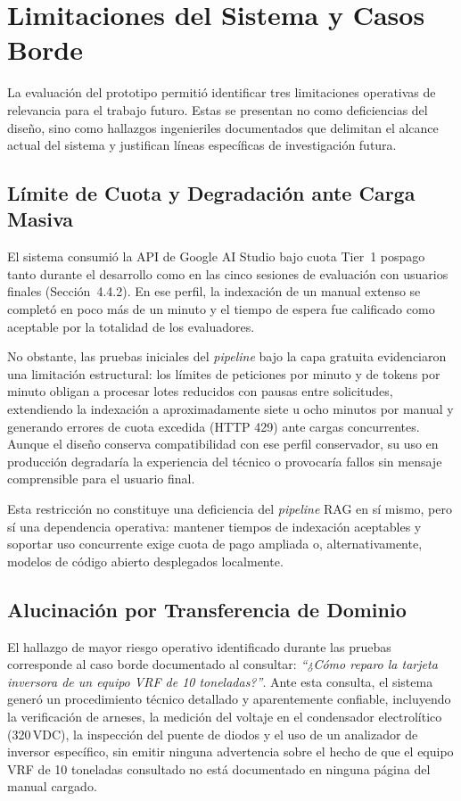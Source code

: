 {{\section{Limitaciones del Sistema y Casos Borde}
\label{sec:limitaciones}

La evaluación del prototipo permitió identificar tres limitaciones operativas de relevancia para el trabajo futuro. Estas se presentan no como deficiencias del diseño, sino como hallazgos ingenieriles documentados que delimitan el alcance actual del sistema y justifican líneas específicas de investigación futura.

\subsection{Límite de Cuota y Degradación ante Carga Masiva}

El sistema consumió la API de Google AI Studio bajo cuota Tier~1 pospago tanto durante el desarrollo como en las cinco sesiones de evaluación con usuarios finales (Sección~4.4.2). En ese perfil, la indexación de un manual extenso se completó en poco más de un minuto y el tiempo de espera fue calificado como aceptable por la totalidad de los evaluadores.

No obstante, las pruebas iniciales del \textit{pipeline} bajo la capa gratuita evidenciaron una limitación estructural: los límites de peticiones por minuto y de tokens por minuto obligan a procesar lotes reducidos con pausas entre solicitudes, extendiendo la indexación a aproximadamente siete u ocho minutos por manual y generando errores de cuota excedida (HTTP 429) ante cargas concurrentes. Aunque el diseño conserva compatibilidad con ese perfil conservador, su uso en producción degradaría la experiencia del técnico o provocaría fallos sin mensaje comprensible para el usuario final.

Esta restricción no constituye una deficiencia del \textit{pipeline} RAG en sí mismo, pero sí una dependencia operativa: mantener tiempos de indexación aceptables y soportar uso concurrente exige cuota de pago ampliada o, alternativamente, modelos de código abierto desplegados localmente.

\subsection{Alucinación por Transferencia de Dominio}

El hallazgo de mayor riesgo operativo identificado durante las pruebas corresponde al caso borde documentado al consultar: \textit{``¿Cómo reparo la tarjeta inversora de un equipo VRF de 10 toneladas?''}. Ante esta consulta, el sistema generó un procedimiento técnico detallado y aparentemente confiable, incluyendo la verificación de arneses, la medición del voltaje en el condensador electrolítico (320\,VDC), la inspección del puente de diodos y el uso de un analizador de inversor específico, sin emitir ninguna advertencia sobre el hecho de que el equipo VRF de 10 toneladas consultado no está documentado en ninguna página del manual cargado.

}}
